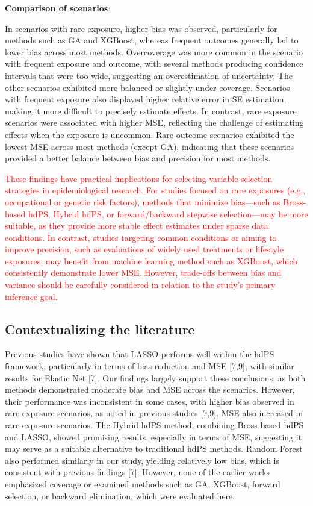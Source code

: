 \documentclass[10pt,letterpaper]{article}
\begin{document}
\textbf{Comparison of scenarios}:

In scenarios with rare exposure, higher bias was observed, particularly
for methods such as GA and XGBoost, whereas frequent outcomes generally
led to lower bias across most methods. Overcoverage was more common in
the scenario with frequent exposure and outcome, with several methods
producing confidence intervals that were too wide, suggesting an
overestimation of uncertainty. The other scenarios exhibited more
balanced or slightly under-coverage. Scenarios with frequent exposure
also displayed higher relative error in SE estimation, making it more
difficult to precisely estimate effects. In contrast, rare exposure
scenarios were associated with higher MSE, reflecting the challenge of
estimating effects when the exposure is uncommon. Rare outcome scenarios
exhibited the lowest MSE across most methods (except GA), indicating
that these scenarios provided a better balance between bias and
precision for most methods.

\textcolor{red}{These findings have practical implications for selecting variable selection strategies in epidemiological research. For studies focused on rare exposures (e.g., occupational or genetic risk factors), methods that minimize bias—such as Bross-based hdPS, Hybrid hdPS, or forward/backward stepwise selection—may be more suitable, as they provide more stable effect estimates under sparse data conditions. In contrast, studies targeting common conditions or aiming to improve precision, such as evaluations of widely used treatments or lifestyle exposures, may benefit from machine learning method such as XGBoost, which consistently demonstrate lower MSE. However, trade-offs between bias and variance should be carefully considered in relation to the study’s primary inference goal.}

\subsection{Contextualizing the
literature}\label{contextualizing-the-literature}

Previous studies have shown that LASSO performs well within the hdPS
framework, particularly in terms of bias reduction and MSE {[}7,9{]},
with similar results for Elastic Net {[}7{]}. Our findings largely
support these conclusions, as both methods demonstrated moderate bias
and MSE across the scenarios. However, their performance was
inconsistent in some cases, with higher bias observed in rare exposure
scenarios, as noted in previous studies {[}7,9{]}. MSE also increased in
rare exposure scenarios. The Hybrid hdPS method, combining Bross-based
hdPS and LASSO, showed promising results, especially in terms of MSE,
suggesting it may serve as a suitable alternative to traditional hdPS
methods. Random Forest also performed similarly in our study, yielding
relatively low bias, which is consistent with previous findings {[}7{]}.
However, none of the earlier works emphasized coverage or examined
methods such as GA, XGBoost, forward selection, or backward elimination,
which were evaluated here.
\end{document}
